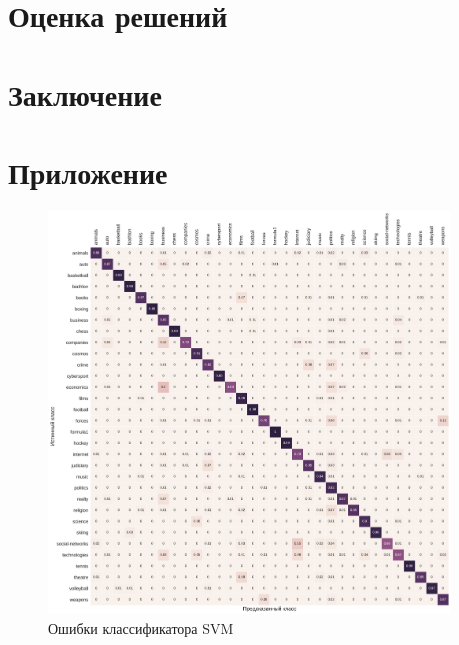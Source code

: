 \documentclass[a4paper, 14pt]{extarticle}
\begin{document}
\section{Оценка решений}
\section{Заключение}



\section*{Приложение}
\begin{figure}[h!]
	\centering
	\includegraphics[width=0.95\textwidth]{svm_matrix}
	\caption{Ошибки классификатора SVM}
	\label{svm_matrix}
\end{figure}
\end{document}
